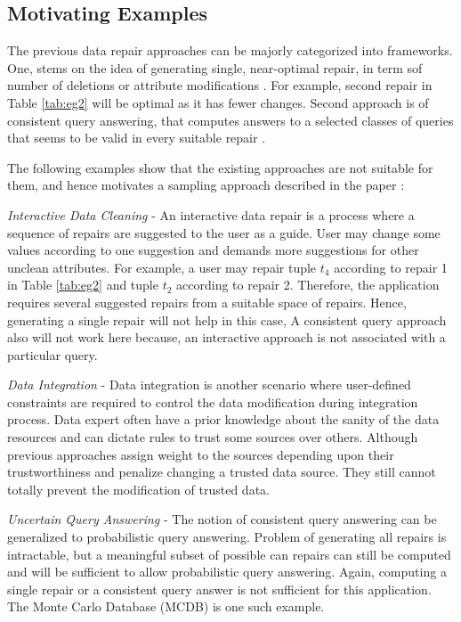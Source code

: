 \subsection{Motivating Examples}
The previous data repair approaches can be majorly categorized into frameworks.
One, stems on the idea of generating single, near-optimal repair, in term sof number of deletions or attribute modifications \cite{Kolahi} \cite{Bohannon}.
For example, second repair in Table \ref{tab:eg2} will be optimal as it has fewer changes.
Second approach is of consistent query answering, that computes answers to a selected classes of queries that seems to be valid in every suitable repair \cite{Arenas,Chomicki,Fuxman,Wijsen}.

The following examples show that the existing approaches are not suitable for them, and hence motivates a sampling approach described in the paper \cite{Beskales_sampling}:

\medskip

\textit{Interactive Data Cleaning} - An interactive data repair is a process where a sequence of repairs are suggested to the user as a guide.
User may change some values according to one suggestion and demands more suggestions for other unclean attributes.
For example, a user may repair tuple $t_4$ according to repair 1 in Table \ref{tab:eg2} and tuple $t_2$ according to repair 2.
Therefore, the application requires several suggested repairs from a suitable space of repairs.
Hence, generating a single repair will not help in this case, 
A consistent query approach also will not work here because, an interactive approach is not associated with a particular query.

\medskip

\textit{Data Integration} - Data integration is another scenario where user-defined constraints are required to control the data modification during integration process.
Data expert often have a prior knowledge about the sanity of the data resources and can dictate rules to trust some sources over others.
Although previous approaches \cite{Bohannon,Kolahi} assign weight to the sources depending upon their trustworthiness and penalize changing a trusted data source.
They still cannot totally prevent the modification of trusted data.

\medskip

\textit{Uncertain Query Answering} - The notion of consistent query answering can be generalized to probabilistic query answering.
Problem of generating all repairs is intractable, but a meaningful subset of possible can repairs can still be computed and will be sufficient to allow probabilistic query answering.
Again, computing a single repair or a consistent query answer is not sufficient for this application.
The Monte Carlo Database (MCDB) \cite{Jampani} is one such example.

